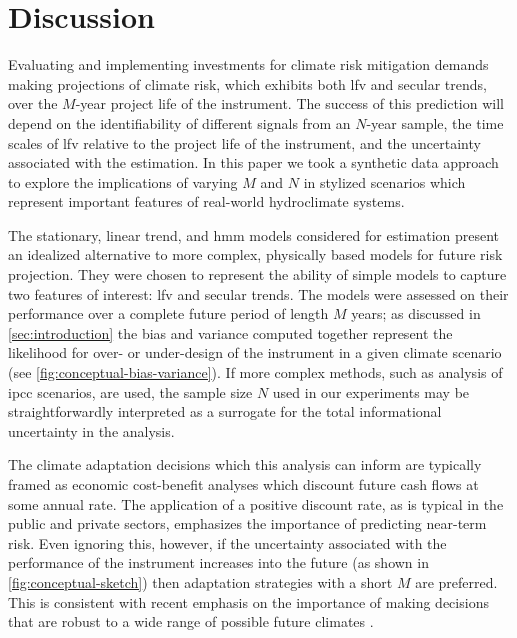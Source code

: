 \documentclass[
  draft,
  linenumbers
]{agujournal2018}
\makeatletter
\newcommand{\ie}{i.e.\@\xspace}
\makeatother
\begin{document}

\clearpage
\section{Discussion}\label{sec:discussion-conclusions}

Evaluating and implementing investments for climate risk mitigation demands making projections of climate risk, which exhibits both \gls{lfv} and secular trends, over the $M$-year project life of the instrument.
The success of this prediction will depend on the identifiability of different signals from an $N$-year sample, the time scales of \gls{lfv} relative to the project life of the instrument, and the uncertainty associated with the estimation.
In this paper we took a synthetic data approach to explore the implications of varying $M$ and $N$ in stylized scenarios which represent important features of real-world hydroclimate systems.

The stationary, linear trend, and \gls{hmm} models considered for estimation present an idealized alternative to more complex, physically based models for future risk projection.
They were chosen to represent the ability of simple models to capture two features of interest: \gls{lfv} and secular trends.
The models were assessed on their performance over a complete future period of length $M$ years; as discussed in \cref{sec:introduction} the bias and variance computed together represent the likelihood for over- or under-design of the instrument in a given climate scenario (see \cref{fig:conceptual-bias-variance}).
If more complex methods, such as analysis of \gls{ipcc} scenarios, are used, the sample size $N$ used in our experiments may be straightforwardly interpreted as a surrogate for the total informational uncertainty in the analysis.

The climate adaptation decisions which this analysis can inform are typically framed as economic cost-benefit analyses which discount future cash flows at some annual rate.
The application of a positive discount rate, as is typical in the public and private sectors, emphasizes the importance of predicting near-term risk.
Even ignoring this, however, if the uncertainty associated with the performance of the instrument increases into the future (as shown in \cref{fig:conceptual-sketch}) then adaptation strategies with a short $M$ are preferred.
This is consistent with recent emphasis on the importance of making decisions that are robust to a wide range of possible future climates \citep[\ie,][]{Haasnoot:2013im, Poff:2015jn}.
\end{document}
